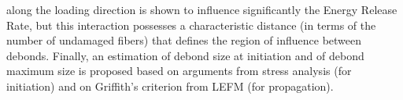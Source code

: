 along the loading direction is shown to influence significantly the Energy Release Rate, but this interaction possesses a characteristic distance (in terms of the number of undamaged fibers) that defines the region of influence between debonds. Finally, an estimation of debond size at initiation and of debond maximum size is proposed based on arguments from stress analysis (for initiation) and on Griffith's criterion from LEFM (for propagation).
